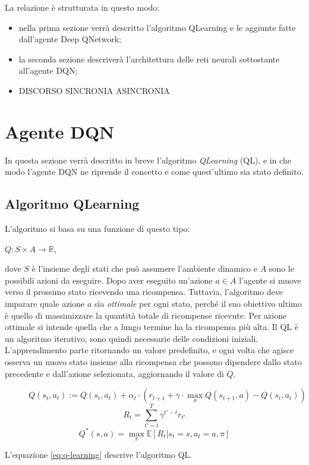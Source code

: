 \documentclass[twoside,twocolumn,10pt]{extarticle}
\theoremstyle{definition}
\begin{document}
	La relazione è strutturata in questo modo:
	\begin{itemize}
		\item nella prima sezione verrà descritto l'algoritmo Q\texttwelveudash Learning e le aggiunte fatte dall'agente Deep Q\texttwelveudash Network;
		\item la seconda sezione descriverà l'architettura delle reti neurali sottostante all'agente DQN;
		\item DISCORSO SINCRONIA ASINCRONIA
	\end{itemize}
	
\section{Agente DQN}\label{sec:dqn-agent}
	In questa sezione verrà descritto in breve l'algoritmo \textit{Q\texttwelveudash Learning} (QL), e in che modo l'agente DQN ne riprende il concetto e come quest'ultimo sia stato definito.

	\subsection{Algoritmo Q\texttwelveudash Learning}
		L'algoritmo si basa su una funzione di questo tipo:
		\begin{center}
			$Q: S\times A \longrightarrow \mathbb{R}$,
		\end{center}
		dove $S$ è l'insieme degli stati che può assumere l'ambiente dinamico e $A$ sono le possibili azioni da eseguire. Dopo aver eseguito un'azione $a \in A$ l'agente si muove verso il prossimo stato ricevendo una ricompensa. Tuttavia, l'algoritmo deve imparare quale azione $a$ sia \textit{ottimale} per ogni stato, perché il suo obiettivo ultimo è quello di massimizzare la quantità totale di ricompense ricevute. Per azione ottimale si intende quella che a lungo termine ha la ricompensa più alta. Il QL è un algoritmo iterativo, sono quindi necessarie delle condizioni iniziali. L'apprendimento parte ritornando un valore predefinito, e ogni volta che agisce osserva un nuovo stato insieme alla ricompensa che possono dipendere dallo stato precedente e dall'azione selezionata, aggiornando il valore di $Q$.
		\begin{figure}[ht]
			\begin{equation}\label{eq:q-learning}
			Q(s_t, a_t) := Q(s_t, a_t) + \alpha_t \cdot (r_{t + 1} + \gamma \cdot \max_a Q(s_{t + 1}, a) - Q(s_t, a_t))
			\end{equation}
			\begin{equation}\label{eq:reward}
				R_t = \sum_{t' = t}^{T} \gamma^{t' - t} r_{t'}
			\end{equation}
			\begin{equation}\label{eq:dqn-learning}
			Q^*(s, a) = \max_\pi \mathbb{E} [R_t | s_t = s, a_t = a, \pi]
			\end{equation}
		\end{figure}
		L'equazione \ref{eq:q-learning} descrive l'algoritmo QL.
		
\end{document}
